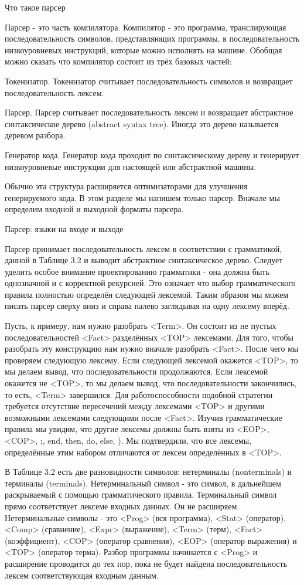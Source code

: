 Что такое парсер

Парсер - это часть компилятора. Компилятор - это программа, транслирующая последовательность символов, представляющих программы, в последовательность низкоуровневых инструкций, которые можно исполнять на машине. Обобщая можно сказать что компилятор состоит из трёх базовых частей:

Токенизатор. Токенизатор считывает последовательность символов и возвращает последовательность лексем.

Парсер. Парсер считывает последовательность лексем и возвращает абстрактное синтаксическое дерево (abstract syntax tree). Иногда это дерево называется деревом разбора.

Генератор кода. Генератор кода проходит по синтаксическому дереву и генерирует низкоуровневые инструкции для настоящей или абстрактной машины.

Обычно эта структура расширяется оптимизаторами для улучшения генерируемого кода. В этом разделе мы напишем только парсер. Вначале мы определим входной и выходной форматы парсера.

Парсер: языки на входе и выходе

Парсер принимает последовательность лексем в соответствии с грамматикой, данной в Таблице 3.2 и выводит абстрактное синтаксическое дерево. Следует уделить особое внимание проектированию грамматики - она должна быть однозначной и с корректной рекурсией. Это означает что выбор грамматического правила полностью определён следующей лексемой. Таким образом мы можем писать парсер сверху вниз и справа налево заглядывая на одну лексему вперёд.

Пусть, к примеру, нам нужно разобрать <Term>. Он состоит из не пустых последовательностей <Fact> разделённых <TOP> лексемами. Для того, чтобы разобрать эту конструкцию нам нужно вначале разобрать <Fact>. После чего мы проверяем следующую лексему. Если следующей лексемой окажется <TOP>, то мы делаем вывод, что последовательности продолжаются. Если лексемой окажется не <TOP>, то мы делаем вывод, что последовательности закончились, то есть, <Term> завершился. Для работоспособности подобной стратегии требуется отсутствие пересечений между лексемами <TOP> и другими возможными лексемами следующими после <Fact>. Изучив грамматические правила мы увидим, что другие лексемы должны быть взяты из {<EOP>, <COP>, ;, end, then, do, else, )}. Мы подтвердили, что все лексемы, определённые этим набором отличаются от лексем определённых в <TOP>.

В Таблице 3.2 есть две разновидности символов: нетерминалы (nonterminals) и терминалы (terminals). Нетерминальный символ - это символ, в дальнейшем раскрываемый с помощью грамматического правила. Терминальный символ прямо соответствует лексеме входных данных. Он не расширяем. Нетерминальные символы - это <Prog> (вся программа), <Stat> (оператор), <Comp> (сравнение), <Expr> (выражение), <Term> (терм), <Fact> (коэффициент), <COP> (оператор сравнения), <EOP> (оператор выражения) и <TOP> (оператор терма). Разбор программы начинается с <Prog> и расширение проводится до тех пор, пока не будет найдена последовательность лексем соответствующая входным данным.

